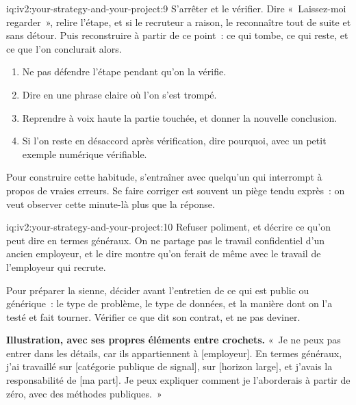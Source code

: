 \begin{solution}{iq:iv2:your-strategy-and-your-project:9}
S'arrêter et le vérifier. Dire «~Laissez-moi regarder~», relire l'étape, et si le recruteur a raison, le reconnaître tout de suite et sans détour. Puis reconstruire à partir de ce point~: ce qui tombe, ce qui reste, et ce que l'on conclurait alors.

\begin{enumerate}
\item Ne pas défendre l'étape pendant qu'on la vérifie.
\item Dire en une phrase claire où l'on s'est trompé.
\item Reprendre à voix haute la partie touchée, et donner la nouvelle conclusion.
\item Si l'on reste en désaccord après vérification, dire pourquoi, avec un petit exemple numérique vérifiable.
\end{enumerate}

Pour construire cette habitude, s'entraîner avec quelqu'un qui interrompt à propos de vraies erreurs. Se faire corriger est souvent un piège tendu exprès~: on veut observer cette minute-là plus que la réponse.

\end{solution}

\begin{solution}{iq:iv2:your-strategy-and-your-project:10}
Refuser poliment, et décrire ce qu'on peut dire en termes généraux. On ne partage pas le travail confidentiel d'un ancien employeur, et le dire montre qu'on ferait de même avec le travail de l'employeur qui recrute.

Pour préparer la sienne, décider avant l'entretien de ce qui est public ou générique~: le type de problème, le type de données, et la manière dont on l'a testé et fait tourner. Vérifier ce que dit son contrat, et ne pas deviner.

\textbf{Illustration, avec ses propres éléments entre crochets.} «~Je ne peux pas entrer dans les détails, car ils appartiennent à [employeur]. En termes généraux, j'ai travaillé sur [catégorie publique de signal], sur [horizon large], et j'avais la responsabilité de [ma part]. Je peux expliquer comment je l'aborderais à partir de zéro, avec des méthodes publiques.~»

\end{solution}

